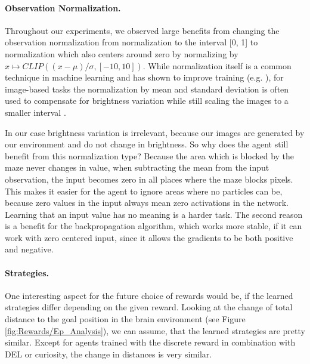 \paragraph{Observation Normalization. } Throughout our experiments, we observed large benefits from changing the observation normalization from normalization to the interval [0, 1] to normalization which also centers around zero by normalizing by $x \mapsto CLIP((x - \mu)/\sigma, [-10, 10])$. While normalization itself is a common technique in machine learning and has shown to improve training (e.g. \cite{jayalakshmi2011statistical}), for image-based tasks the normalization by mean and standard deviation is often used to compensate for brightness variation while still scaling the images to a smaller interval \cite{pal2016preprocessing}. 

In our case brightness variation is irrelevant, because our images are generated by our environment and do not change in brightness. So why does the agent still benefit from this normalization type? Because the area which is blocked by the maze never changes in value, when subtracting the mean from the input observation, the input becomes zero in all places where the maze blocks pixels. This makes it easier for the agent to ignore areas where no particles can be, because zero values in the input always mean zero activations in the network. Learning that an input value has no meaning is a harder task. The second reason is a benefit for the backpropagation algorithm, which works more stable, if it can work with zero centered input, since it allows the gradients to be both positive and negative.

\paragraph{Strategies.}
One interesting aspect for the future choice of rewards would be, if the learned strategies differ depending on the given reward. Looking at the change of total distance to the goal position in the brain environment (see Figure \ref{fig:Rewards/Ep_Analysis}), we can assume, that the learned strategies are pretty similar. Except for agents trained with the discrete reward in combination with DEL or curiosity, the change in distances is very similar.  

